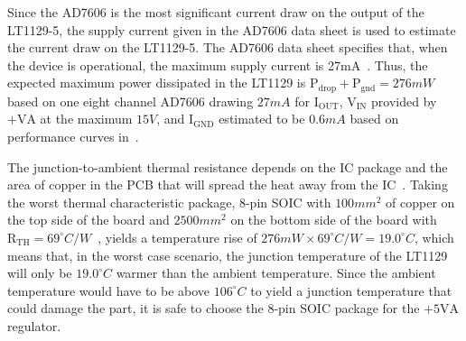 Since the AD7606 is the most significant current draw on the output of the LT1129-5, the supply current given in the AD7606 data sheet is used to estimate the current draw on the LT1129-5.  The AD7606 data sheet specifies that, when the device is operational, the maximum supply current is 27mA~\cite{AD7606ds}.  Thus, the expected maximum power dissipated in the LT1129 is $\mathrm{P}_{\mathrm{drop}} + \mathrm{P}_{\mathrm{gnd}} = 276\unit{mW}$ based on one eight channel AD7606 drawing $27\unit{mA}$ for $\mathrm{I}_{\mathrm{OUT}}$, $\mathrm{V}_{\mathrm{IN}}$ provided by $+\mathrm{VA}$ at the maximum $15\unit{V}$, and $\mathrm{I}_{\mathrm{GND}}$ estimated to be $0.6\unit{mA}$ based on performance curves in~\cite{LT1129ds}.

The junction-to-ambient thermal resistance depends on the IC package and the area of copper in the PCB that will spread the heat away from the IC~\cite{LT1129ds}.  Taking the worst thermal characteristic package, 8-pin SOIC with $100\unit{mm}^2$ of copper on the top side of the board and $2500\unit{mm}^2$ on the bottom side of the board with $\mathrm{R}_{\mathrm{TH}}=69^\circ \unit{C} / \unit{W}$~\cite{LT1129ds}, yields a temperature rise of $276\unit{mW} \times 69^\circ \unit{C} / \unit{W} = 19.0^\circ \unit{C}$, which means that, in the worst case scenario, the junction temperature of the LT1129 will only be $19.0^\circ \unit{C}$ warmer than the ambient temperature.  Since the ambient temperature would have to be above $106^\circ \unit{C}$ to yield a junction temperature that could damage the part, it is safe to choose the 8-pin SOIC package for the $+5\mathrm{VA}$ regulator.

